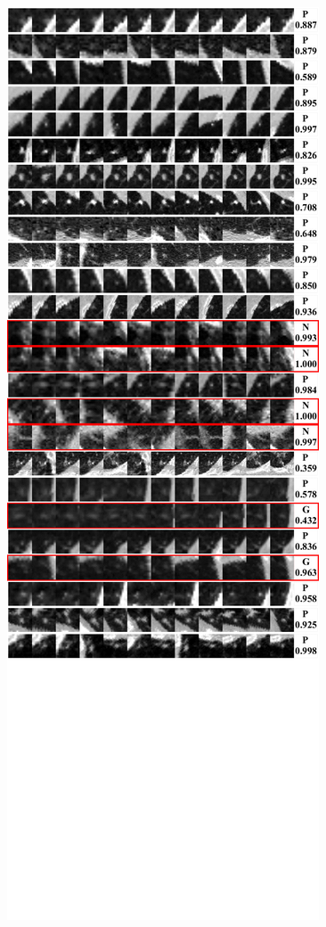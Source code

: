 \documentclass[onecolumn]{IEEEtran}
\begin{document}
\begin{figure}[H]
{\includegraphics[width=0.45\columnwidth]{./images/elcap-msnodules-tail1}
}
\end{figure}

\newpage
\end{document}
